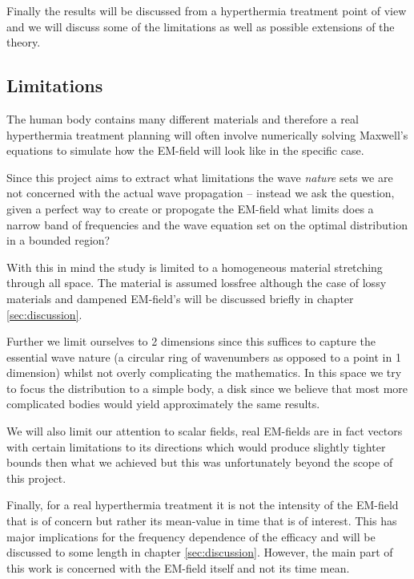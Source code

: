 \documentclass[11pt,a4paper, 
swedish,english %
]{article}
\begin{document}
Finally the results will be discussed from a hyperthermia treatment point of view and we will discuss some of the limitations as well as possible extensions of the theory.


\subsection{Limitations}
The human body contains many different materials and therefore a real hyperthermia treatment planning will often involve numerically solving Maxwell's equations to simulate how the EM-field will look like in the specific case.

Since this project aims to extract what limitations the wave \emph{nature} sets we are not concerned with the actual wave propagation -- instead we ask the question, given a perfect way to create or propogate the EM-field what limits does a narrow band of frequencies and the wave equation set on the optimal distribution in a bounded region?

With this in mind the study is limited to a homogeneous material stretching through all space. The material is assumed lossfree although the case of lossy materials and dampened EM-field's will be discussed briefly in chapter \ref{sec:discussion}.

Further we limit ourselves to 2 dimensions since this suffices to capture the essential wave nature (a circular ring of wavenumbers as opposed to a point in 1 dimension) whilst not overly complicating the mathematics. 
In this space we try to focus the distribution to a simple body, a disk since we believe that most more complicated bodies would yield approximately the same results.

We will also limit our attention to scalar fields, real EM-fields are in fact vectors with certain limitations to its directions which would produce slightly tighter bounds then what we achieved but this was unfortunately beyond the scope of this project.

Finally, for a real hyperthermia treatment it is not the intensity of the EM-field that is of concern but rather its mean-value in time that is of interest. This has major implications for the frequency dependence of the efficacy and will be discussed to some length in chapter \ref{sec:discussion}. However, the main part of this work is concerned with the EM-field itself and not its time mean.
\end{document}
